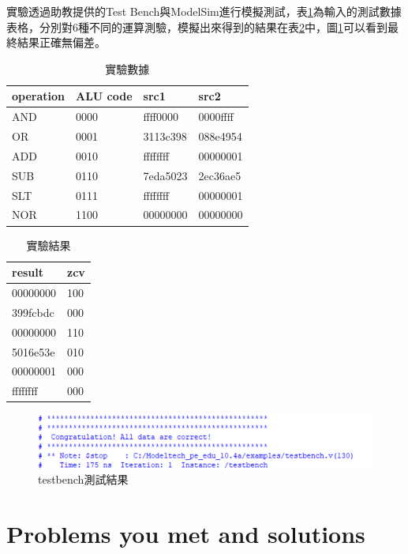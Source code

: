 \documentclass[12pt,a4paper]{article}
\theoremstyle{definition}
\begin{document}
實驗透過助教提供的Test Bench與ModelSim進行模擬測試，表\ref{tab:data}為輸入的測試數據表格，分別對6種不同的運算測驗，模擬出來得到的結果在表\ref{tab:result}中，圖\ref{fig:result}可以看到最終結果正確無偏差。
\begin{table}[H]
\centering
\caption
{實驗數據}
\label{tab:data}
\begin{tabular}{llll} \toprule
operation & ALU code & src1 & src2 \\
\midrule
AND & 0000 & ffff0000 & 0000ffff
\\
OR & 0001 & 3113c398 & 088e4954
\\
ADD & 0010 & ffffffff & 00000001
\\
SUB & 0110 & 7eda5023 & 2ec36ae5
\\
SLT & 0111 & ffffffff & 00000001
\\
NOR & 1100 & 00000000 & 00000000
\\ \bottomrule
\end{tabular}
\end{table}

\begin{table}[H]
\centering
\caption
{實驗結果}
\label{tab:result}
\begin{tabular}{ll} \toprule
result & zcv \\
\midrule
00000000 & 100
\\
399fcbdc & 000
\\
00000000 & 110
\\
5016e53e & 010
\\
00000001 & 000
\\
ffffffff & 000
\\ \bottomrule
\end{tabular}
\end{table}

\begin{figure}[H]
\centering
\includegraphics[width=16cm]{fig/result.png}
\caption{testbench測試結果}
\label{fig:result}
\end{figure}

\section{Problems you met and solutions}
\end{document}
